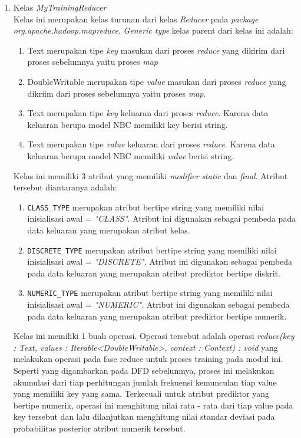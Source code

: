 \begin{enumerate}
	\item{Kelas \textit{MyTrainingReducer}}\\
	Kelas ini merupakan kelas turunan dari kelas \textit{Reducer} pada \textit{package org.apache.hadoop.mapreduce}. \textit{Generic type} kelas parent dari kelas ini adalah: 
	\begin{enumerate}
		\item Text merupakan tipe \textit{key} masukan dari proses \textit{reduce} yang dikirim dari proses sebelumnya yaitu proses \textit{map}
		\item DoubleWritable merupakan tipe \textit{value} masukan dari proses \textit{reduce} yang dikriim dari proses sebelumnya yaitu proses \textit{map}.
		\item Text merupakan tipe \textit{key} keluaran dari proses \textit{reduce}. Karena data keluaran berupa model NBC memiliki key berisi string.
		\item Text merupakan tipe \textit{value} keluaran dari proses \textit{reduce}. Karena data keluaran berupa model NBC memiliki \textit{value} berisi string.
	\end{enumerate}
	Kelas ini memiliki 3 atribut yang memiliki \textit{modifier} \textit{static} dan \textit{final}. Atribut tersebut diantaranya adalah:
	\begin{enumerate}
		\item \verb|CLASS_TYPE| merupakan atribut bertipe string yang memiliki nilai inisialisasi awal = \textit{"CLASS"}. Atribut ini digunakan sebagai pembeda pada data keluaran yang merupakan atribut kelas.
				
		\item \verb|DISCRETE_TYPE| merupakan atribut bertipe string yang memiliki nilai inisialisasi awal = \textit{"DISCRETE"}. Atribut ini digunakan sebagai pembeda pada data keluaran yang merupakan atribut prediktor bertipe diskrit.

		\item \verb|NUMERIC_TYPE| merupakan atribut bertipe string yang memiliki nilai inisialisasi awal = \textit{"NUMERIC"}. Atribut ini digunakan sebagai pembeda pada data keluaran yang merupakan atribut prediktor bertipe numerik.
	\end{enumerate}
	
	Kelas ini memiliki 1 buah operasi. Operasi tersebut adalah operasi \textit{reduce(key : Text, values : Iterable<DoubleWritable>, context : Context) : void} yang melakukan operasi pada fase reduce untuk proses training pada modul ini. Seperti yang digambarkan pada DFD sebelumnya, proses ini melakukan akumulasi dari tiap perhitungan jumlah frekuensi kemunculan tiap value yang memiliki key yang sama. Terkecuali untuk atribut prediktor yang bertipe numerik, operasi ini menghitung nilai rata - rata dari tiap value pada key tersebut dan lalu dilanjutkan menghitung nilai standar deviasi pada probabilitas posterior atribut numerik tersebut.
	

\end{enumerate}
